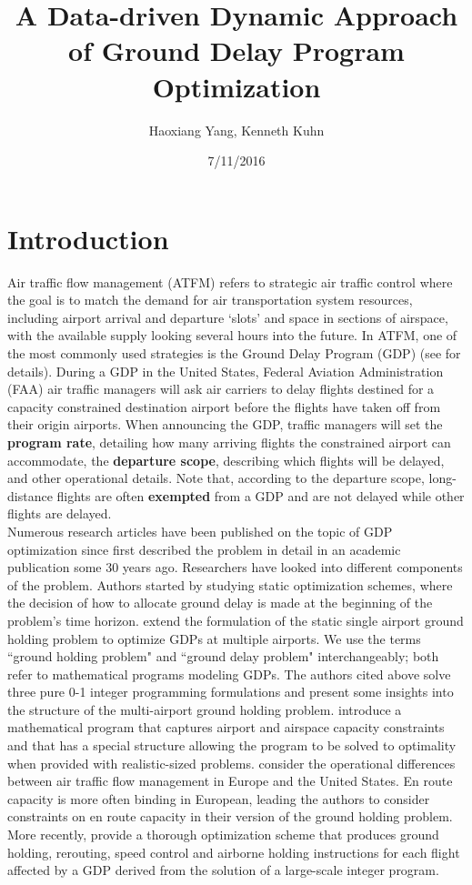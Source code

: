 \documentclass[12pt]{article}
\title{A Data-driven Dynamic Approach of Ground Delay Program Optimization}
\author{Haoxiang Yang, Kenneth Kuhn}
\date{7/11/2016}
\begin{document}
\maketitle

\section{Introduction} \label{Intro}
	Air traffic flow management (ATFM) refers to strategic air traffic control where the goal is to match the demand for air transportation system resources, including airport arrival and departure `slots' and space in sections of airspace, with the available supply looking several hours into the future.  In ATFM, one of the most commonly used strategies is the Ground Delay Program (GDP) (see \cite{ball2007air} for details).  During a GDP in the United States, Federal Aviation Administration (FAA) air traffic managers will ask air carriers to delay flights destined for a capacity constrained destination airport before the flights have taken off from their origin airports.  When announcing the GDP, traffic managers will set the {\bf program rate}, detailing how many arriving flights the constrained airport can accommodate, the {\bf departure scope}, describing which flights will be delayed, and other operational details.  Note that, according to the departure scope, long-distance flights are often {\bf exempted} from a GDP and are not delayed while other flights are delayed.\\
	\newline
	Numerous research articles have been published on the topic of GDP optimization since \cite{odoni} first described the problem in detail in an academic publication some 30 years ago. Researchers have looked into different components of the problem. Authors started by studying static optimization schemes, where the decision of how to allocate ground delay is made at the beginning of the problem's time horizon.  \cite{vranas1994multi} extend the formulation of the static single airport ground holding problem to optimize GDPs at multiple airports. We use the terms ``ground holding problem" and ``ground delay problem" interchangeably; both refer to mathematical programs modeling GDPs. The authors cited above solve three pure 0-1 integer programming formulations and present some insights into the structure of the multi-airport ground holding problem. \cite{ssp} introduce a mathematical program that captures airport and airspace capacity constraints and that has a special structure allowing the program to be solved to optimality when provided with realistic-sized problems.  \cite{lulli2007european} consider the operational differences between air traffic flow management in Europe and the United States. En route capacity is more often binding in European, leading the authors to consider constraints on en route capacity in their version of the ground holding problem. More recently, \cite{bertsimas2011integer} provide a thorough optimization scheme that produces ground holding, rerouting, speed control and airborne holding instructions for each flight affected by a GDP derived from the solution of a large-scale integer program.\\
\end{document}
